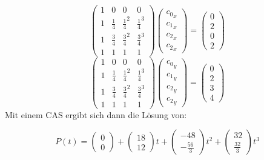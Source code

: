 \begin{displaymath}
\begin{pmatrix}
1 & 0 & 0 & 0 \\
1 & \frac{1}{4} & \frac{1}{4}^2 & \frac{1}{4}^3 \\
1 & \frac{3}{4} & \frac{3}{4}^2 & \frac{3}{4}^3 \\
1 & 1 & 1 & 1
\end{pmatrix}
\begin{pmatrix}
{c_0}_x \\
{c_1}_x \\
{c_2}_x \\
{c_2}_x
\end{pmatrix}
= 
\begin{pmatrix}
0 \\
2 \\
0 \\
2 
\end{pmatrix}
\end{displaymath}
\begin{displaymath}
\begin{pmatrix}
1 & 0 & 0 & 0 \\
1 & \frac{1}{4} & \frac{1}{4}^2 & \frac{1}{4}^3 \\
1 & \frac{3}{4} & \frac{3}{4}^2 & \frac{3}{4}^3 \\
1 & 1 & 1 & 1
\end{pmatrix}
\begin{pmatrix}
{c_0}_y \\
{c_1}_y \\
{c_2}_y \\
{c_2}_y
\end{pmatrix}
= 
\begin{pmatrix}
0 \\
2 \\
3 \\
4 
\end{pmatrix}
\end{displaymath}
Mit einem CAS ergibt sich dann die Lösung von:

\begin{displaymath}
P(t) = \begin{pmatrix} 0 \\ 0 \end{pmatrix} + \begin{pmatrix} 18 \\ 12 \end{pmatrix} t+ \begin{pmatrix} -48 \\ -\frac{56}{3} \end{pmatrix} t^2+ \begin{pmatrix} 32\\ \frac{32}{3} \end{pmatrix} t^3
\end{displaymath}

